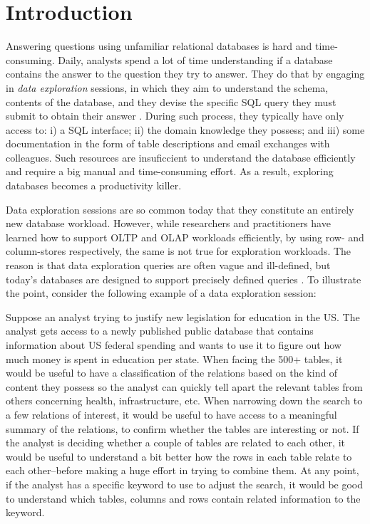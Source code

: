 
\newcommand{\specialcell}[2][c]{%
  \begin{tabular}[#1]{@{}c@{}}#2\end{tabular}}

\section*{Introduction}
\label{introduction}

Answering questions using unfamiliar relational databases is hard and
time-consuming. Daily, analysts spend a lot of time understanding if a database
contains the answer to the question they try to answer. They do that by engaging
in \emph{data exploration} sessions, in which they aim to understand the schema,
contents of the database, and they devise the specific SQL query they must
submit to obtain their answer \cite{dataexploration}. During such process, they typically have
only access to: i) a SQL interface; ii) the domain knowledge they possess; and
iii) some documentation in the form of table descriptions and email exchanges
with colleagues. Such resources are insuficcient to understand the database
efficiently and require a big manual and time-consuming effort. As a result,
exploring databases becomes a productivity killer.

Data exploration sessions are so common today that they constitute an entirely
new database workload. However, while researchers and practitioners have
learned how to support OLTP and OLAP workloads efficiently, \ie by using row-
and column-stores respectively, the same is not true for exploration workloads.
The reason is that data exploration queries are often vague and ill-defined, but
today's databases are designed to support precisely defined queries \cite{db}. To
illustrate the point, consider the following example of a data exploration
session:

Suppose an analyst trying to justify new legislation for education in the US.
The analyst gets access to a newly published public database that
contains information about US federal spending and wants to use it to figure out
how much money is spent in education per state. When facing the 500+ tables, it
would be useful to have a classification of the relations based on the kind of
content they possess so the analyst can quickly tell apart the relevant tables
from others concerning health, infrastructure, etc. When narrowing down the
search to a few relations of interest, it would be useful to have access to a
meaningful summary of the relations, to confirm whether the tables are
interesting or not. If the analyst is deciding whether a couple of tables are
related to each other, it would be useful to understand a bit better how the
rows in each table relate to each other--before making a huge effort in trying
to combine them. At any point, if the analyst has a specific keyword to use to
adjust the search, it would be good to understand which tables, columns and rows
contain related information to the keyword.

